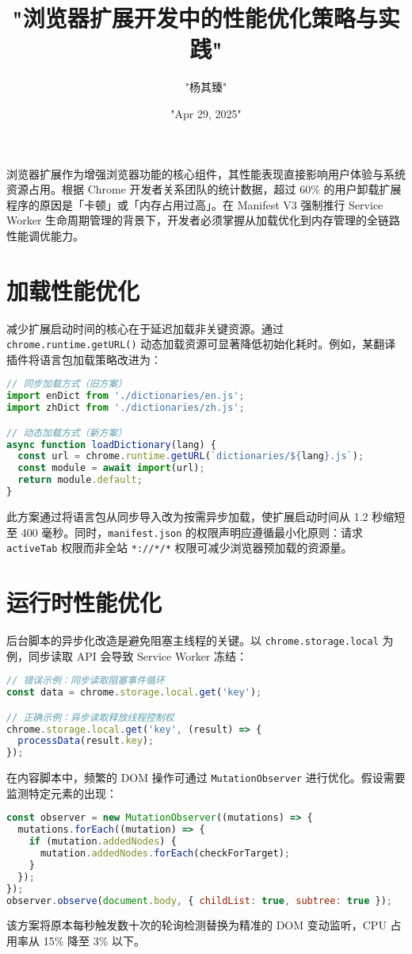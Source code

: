 \title{"浏览器扩展开发中的性能优化策略与实践"}
\author{"杨其臻"}
\date{"Apr 29, 2025"}
\maketitle
浏览器扩展作为增强浏览器功能的核心组件，其性能表现直接影响用户体验与系统资源占用。根据 Chrome 开发者关系团队的统计数据，超过 60\%{} 的用户卸载扩展程序的原因是「卡顿」或「内存占用过高」。在 Manifest V3 强制推行 Service Worker 生命周期管理的背景下，开发者必须掌握从加载优化到内存管理的全链路性能调优能力。\par
\chapter{加载性能优化}
减少扩展启动时间的核心在于延迟加载非关键资源。通过 \verb!chrome.runtime.getURL()! 动态加载资源可显著降低初始化耗时。例如，某翻译插件将语言包加载策略改进为：\par
\begin{lstlisting}[language=javascript]
// 同步加载方式（旧方案）
import enDict from './dictionaries/en.js';
import zhDict from './dictionaries/zh.js';

// 动态加载方式（新方案）
async function loadDictionary(lang) {
  const url = chrome.runtime.getURL(`dictionaries/${lang}.js`);
  const module = await import(url);
  return module.default;
}
\end{lstlisting}
此方案通过将语言包从同步导入改为按需异步加载，使扩展启动时间从 1.2 秒缩短至 400 毫秒。同时，\verb!manifest.json! 的权限声明应遵循最小化原则：请求 \verb!activeTab! 权限而非全站 \verb!*://*/*! 权限可减少浏览器预加载的资源量。\par
\chapter{运行时性能优化}
后台脚本的异步化改造是避免阻塞主线程的关键。以 \verb!chrome.storage.local! 为例，同步读取 API 会导致 Service Worker 冻结：\par
\begin{lstlisting}[language=javascript]
// 错误示例：同步读取阻塞事件循环
const data = chrome.storage.local.get('key'); 

// 正确示例：异步读取释放线程控制权
chrome.storage.local.get('key', (result) => {
  processData(result.key);
});
\end{lstlisting}
在内容脚本中，频繁的 DOM 操作可通过 \verb!MutationObserver! 进行优化。假设需要监测特定元素的出现：\par
\begin{lstlisting}[language=javascript]
const observer = new MutationObserver((mutations) => {
  mutations.forEach((mutation) => {
    if (mutation.addedNodes) {
      mutation.addedNodes.forEach(checkForTarget);
    }
  });
});
observer.observe(document.body, { childList: true, subtree: true });
\end{lstlisting}
该方案将原本每秒触发数十次的轮询检测替换为精准的 DOM 变动监听，CPU 占用率从 15\%{} 降至 3\%{} 以下。\par
